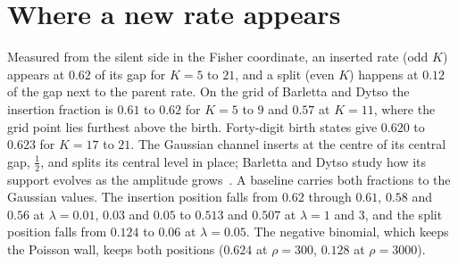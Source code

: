 \documentclass[journal]{IEEEtran}
\begin{document}
\section{Where a new rate appears}\label{app:birth}
Measured from the silent side in the Fisher coordinate, an inserted rate (odd $K$) appears at $0.62$ of its gap for $K = 5$ to $21$,
and a split (even $K$) happens at $0.12$ of the gap next to the parent rate. On the grid of Barletta and Dytso the insertion fraction is
$0.61$ to $0.62$ for $K = 5$ to $9$ and $0.57$ at $K = 11$, where the grid point lies furthest above the birth. Forty-digit birth states
give $0.620$ to $0.623$ for $K = 17$ to $21$. The Gaussian channel inserts at the centre of its central gap, $\frac12$, and splits its central level in
place; Barletta and Dytso study how its support evolves as the amplitude grows~\cite{BarlettaDytso2026}. A baseline
carries both fractions to the Gaussian values. The insertion position falls from $0.62$ through $0.61$, $0.58$ and $0.56$ at $\lambda =
0.01$, $0.03$ and $0.05$ to $0.513$ and $0.507$ at $\lambda = 1$ and $3$, and the split position falls from $0.124$ to $0.06$ at
$\lambda = 0.05$. The negative binomial, which keeps the Poisson wall, keeps both positions ($0.624$ at $\rho = 300$, $0.128$ at
$\rho = 3000$).
\end{document}

